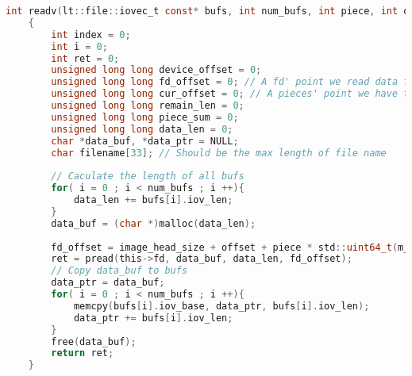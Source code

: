 \begin{minipage}{\textwidth}
\begin{lstlisting}[label={readv},caption={readv function of BT Server},language=c]
int readv(lt::file::iovec_t const* bufs, int num_bufs, int piece, int offset, int flags, lt::storage_error& ec)
	{
		int index = 0;
		int i = 0;
		int ret = 0;
		unsigned long long device_offset = 0;
		unsigned long long fd_offset = 0; // A fd' point we read data from fd from 
		unsigned long long cur_offset = 0; // A pieces' point we have to write data until
		unsigned long long remain_len = 0;
		unsigned long long piece_sum = 0;
		unsigned long long data_len = 0;
		char *data_buf, *data_ptr = NULL;
		char filename[33]; // Should be the max length of file name
		
		// Caculate the length of all bufs
		for( i = 0 ; i < num_bufs ; i ++){
			data_len += bufs[i].iov_len;
		}
		data_buf = (char *)malloc(data_len);
		
		fd_offset = image_head_size + offset + piece * std::uint64_t(m_files.piece_length());
		ret = pread(this->fd, data_buf, data_len, fd_offset);
		// Copy data_buf to bufs
		data_ptr = data_buf;
		for( i = 0 ; i < num_bufs ; i ++){
			memcpy(bufs[i].iov_base, data_ptr, bufs[i].iov_len);
			data_ptr += bufs[i].iov_len;
		}
		free(data_buf);
		return ret;
	}
\end{lstlisting}
\end{minipage}
